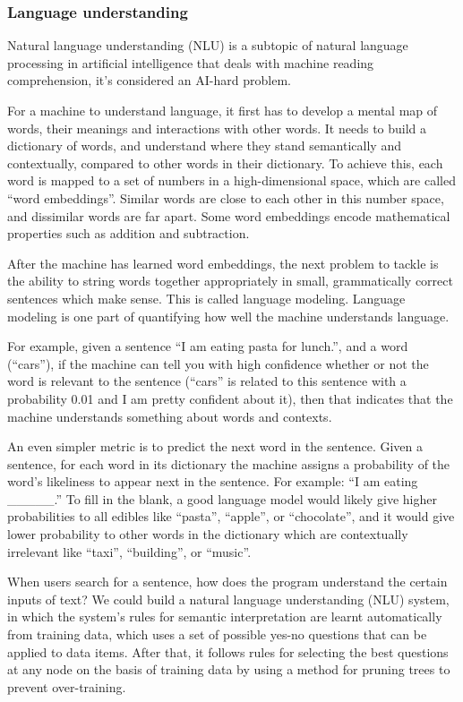 \subsubsection*{Language understanding}

Natural language understanding (NLU) is a subtopic of natural language processing in artificial intelligence that deals with machine reading comprehension, it's considered an AI-hard problem.

For a machine to understand language, it first has to develop a mental map of words, their meanings and interactions with other words. It needs to build a dictionary of words, and understand where they stand semantically and contextually, compared to other words in their dictionary. To achieve this, each word is mapped to a set of numbers in a high-dimensional space, which are called “word embeddings”. Similar words are close to each other in this number space, and dissimilar words are far apart. Some word embeddings encode mathematical properties such as addition and subtraction.

After the machine has learned word embeddings, the next problem to tackle is the ability to string words together appropriately in small, grammatically correct sentences which make sense. This is called language modeling. Language modeling is one part of quantifying how well the machine understands language.

For example, given a sentence “I am eating pasta for lunch.”, and a word (“cars”), if the machine can tell you with high confidence whether or not the word is relevant to the sentence (“cars” is related to this sentence with a probability 0.01 and I am pretty confident about it), then that indicates that the machine understands something about words and contexts.

An even simpler metric is to predict the next word in the sentence. Given a sentence, for each word in its dictionary the machine assigns a probability of the word’s likeliness to appear next in the sentence. For example: “I am eating _____.” To fill in the blank, a good language model would likely give higher probabilities to all edibles like “pasta”, “apple”, or “chocolate”, and it would give lower probability to other words in the dictionary which are contextually irrelevant like “taxi”, “building”, or “music”.

When users search for a sentence, how does the program understand the certain inputs of text? We could build a natural language understanding (NLU) system, in which the system's rules for semantic interpretation are learnt automatically from training data, which uses a set of possible yes-no questions that can be applied to data items.
After that, it follows rules for selecting the best questions at any node on the basis of training data by using a method for pruning trees to prevent over-training.

